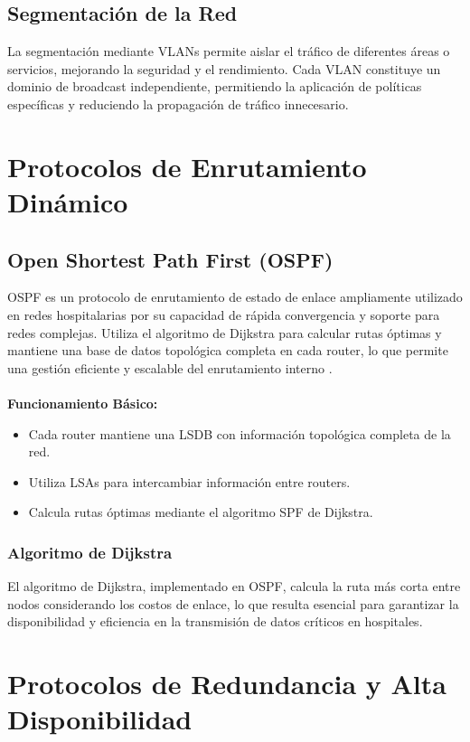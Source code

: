 \subsection{Segmentación de la Red}
La segmentación mediante VLANs permite aislar el tráfico de diferentes áreas o servicios, mejorando la seguridad y el rendimiento. 
Cada VLAN constituye un dominio de broadcast independiente, permitiendo la aplicación de políticas específicas y reduciendo la propagación de tráfico innecesario.

\section{Protocolos de Enrutamiento Dinámico}
\subsection{Open Shortest Path First (OSPF)}
\label{subsec:ospf}
OSPF es un protocolo de enrutamiento de estado de enlace ampliamente utilizado en redes hospitalarias por su capacidad de rápida convergencia y soporte para redes complejas. 
Utiliza el algoritmo de Dijkstra para calcular rutas óptimas y mantiene una base de datos topológica completa en cada router, lo que permite una gestión eficiente y escalable 
del enrutamiento interno \cite{cisco-ospf}.
\\ \\
\textbf{Funcionamiento Básico:}
\begin{itemize}
    \item Cada router mantiene una \ac{LSDB} con información topológica completa de la red.
    \item Utiliza \ac{LSA}s para intercambiar información entre routers.
    \item Calcula rutas óptimas mediante el algoritmo \ac{SPF} de Dijkstra.
\end{itemize}

\subsubsection{Algoritmo de Dijkstra}
El algoritmo de Dijkstra, implementado en OSPF, calcula la ruta más corta entre nodos considerando los costos de enlace, lo que resulta esencial para garantizar la disponibilidad 
y eficiencia en la transmisión de datos críticos en hospitales.

\section{Protocolos de Redundancia y Alta Disponibilidad}
